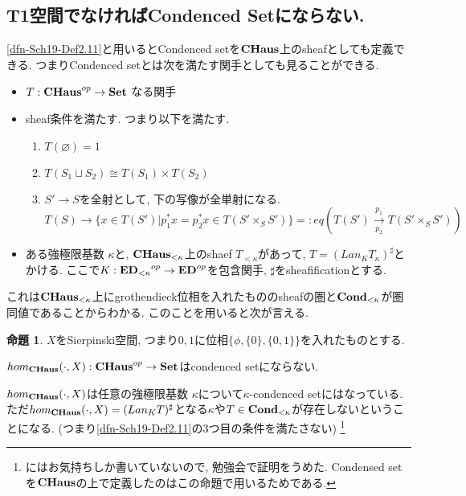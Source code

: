 \documentclass[dvipdfmx,a4paper,11pt]{article}
\theoremstyle{definition}
\newtheorem{prop}[thm]{命題}
\begin{document}
\subsection{T1空間でなければCondenced Setにならない.}
\ref{dfn-Sch19-Def2.11}と用いるとCondenced setを${\bf CHaus}$上のsheafとしても定義できる. 
つまりCondenced setとは次を満たす関手としても見ることができる. 
\begin{itemize}
\item $T : {\bf CHaus}^{op} \to {\bf Set}$ なる関手
\item sheaf条件を満たす. 
つまり以下を満たす.
\begin{enumerate}
\item $T(\varnothing)=1$ 
\item $T(S_1\sqcup S_2) \cong T(S_1) \times T(S_2)$
\item $S' \to S$を全射として, 下の写像が全単射になる.
$$T(S) \to \{ x \in T(S') | p_{1}^{*}x = p_{2}^{*}x \in T(S' \times_S S')\}
=:eq(T(S') \underset{p_2}{\overset{p_1}{\to}}T(S' \times_S S'))
$$
\end{enumerate}
\item ある強極限基数 $\kappa$と, ${\bf CHaus}_{< \kappa}$上のshaef $T_{< \kappa}$があって, $T = (Lan_{K}T_{\kappa})^{\sharp}$とかける. ここで$K : {{\bf ED}_{<\kappa}}^{op} \to {\bf ED}^{op}$を包含関手, $\sharp$をsheafificationとする. 
\end{itemize}

これは${ \bf CHaus}_{< \kappa}$上にgrothendieck位相を入れたもののsheafの圏と${\bf  Cond}_{< \kappa}$が圏同値であることからわかる. 
このことを用いると次が言える. 

\begin{tcolorbox}
 [colback = white, colframe = green!35!black, fonttitle = \bfseries,breakable = true]
\begin{prop}\cite[Warning 2.14]{Sch19}
$X$をSierpinski空間, つまり${0,1}$に位相$\{\phi, \{0\}, \{0,1\} \}$を入れたものとする.

$hom_{{\bf CHaus}}(\cdot,  X) :{\bf CHaus}^{op} \to{\bf Set} $はcondenced setにならない.
\end{prop}
 \end{tcolorbox}
 
 $hom_{{\bf CHaus}}(\cdot,  X)$は任意の強極限基数
 $\kappa$について$\kappa$-condenced setにはなっている. 
 ただ$hom_{{\bf CHaus}}(\cdot,  X) =  (Lan_{K}T)^{\sharp}$となる$\kappa$や$T \in {\bf Cond}_{< \kappa}$が存在しないということになる. (つまり\ref{dfn-Sch19-Def2.11}の3つ目の条件を満たさない)
 \footnote{\cite[Warning 2.14]{Sch19}にはお気持ちしか書いていないので, 勉強会で証明をうめた. Condensed setを${\bf CHaus}$の上で定義したのはこの命題で用いるためである.}
 
\end{document}
